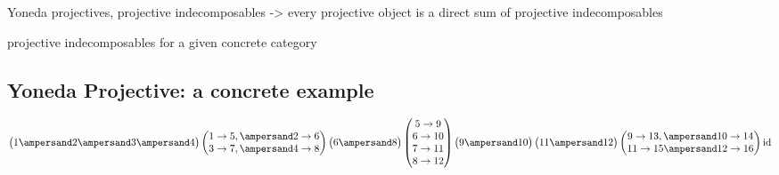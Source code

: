 Yoneda projectives, projective indecomposables -> every projective object is a direct sum of projective indecomposables

projective indecomposables for a given concrete category

\subsection{Yoneda Projective: a concrete example}

\[
\begin{pmatrix}1 \ampersand 2 \ampersand 3 \ampersand 4\end{pmatrix}
\begin{pmatrix} 1\to5, \ampersand 2\to6 \\ 3\to7, \ampersand 4\to8 \end{pmatrix}
\begin{pmatrix}6 \ampersand 8\end{pmatrix}
\begin{pmatrix}5\to9\\6\to10\\7\to11\\8\to12\end{pmatrix}
\begin{pmatrix}9\ampersand10\end{pmatrix}\begin{pmatrix}11\ampersand12\end{pmatrix}
\begin{pmatrix}9\to13, \ampersand 10\to14\\11\to15 \ampersand 12\to16\end{pmatrix}
\textup{id}
\]


